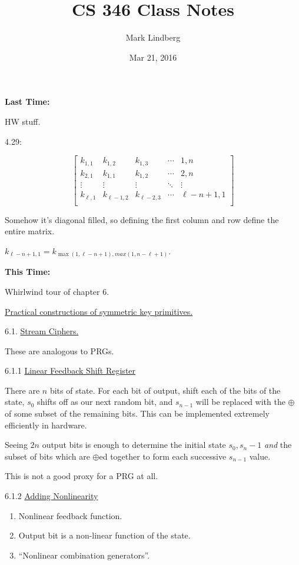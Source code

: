 \documentclass[12pt]{article}
\newcommand{\xor}{\oplus}
\begin{document}
\title{CS 346 Class Notes}
\date{Mar 21, 2016}
\author{Mark Lindberg}
\maketitle
\thispagestyle{fancy}

{\bf Last Time:}

HW stuff.

4.29:

$$\begin{bmatrix}
k_{1,1}&k_{1,2}&k_{1,3}&\cdots&{1,n}\\
k_{2,1}&k_{1,1}&k_{1,2}&\cdots&{2,n}\\
\vdots&\vdots&\vdots&\ddots&\vdots\\
k_{\ell,1}&k_{\ell-1,2}&k_{\ell-2,3}&\cdots&{\ell-n+1,1}\\
\end{bmatrix}$$

Somehow it's diagonal filled, so defining the first column and row define the entire matrix.

$k_{\ell-n+1,1}=k_{\max(1,\ell-n+1),max(1,n-\ell+1)}$.

{\bf This Time:}

Whirlwind tour of chapter 6.

\underline{Practical constructions of symmetric key primitives.}

6.1. \underline{Stream Ciphers.}

These are analogous to PRGs.

6.1.1 \underline{Linear Feedback Shift Register}

There are $n$ bits of state. For each bit of output, shift each of the bits of the state, $s_0$ shifts off as our next random bit, and $s_{n-1}$ will be replaced with the $\xor$ of some subset of the remaining bits. This can be implemented extremely efficiently in hardware.

Seeing $2n$ output bits is enough to determine the initial state $s_0,s_n-1$ {\it and} the subset of bits which are $\xor$ed together to form each successive $s_{n-1}$ value.

This is not a good proxy for a PRG at all.

6.1.2 \underline{Adding Nonlinearity}

\begin{enumerate}

\item Nonlinear feedback function.

\item Output bit is a non-linear function of the state.

\item ``Nonlinear combination generators''.

\end{enumerate}
\end{document}
